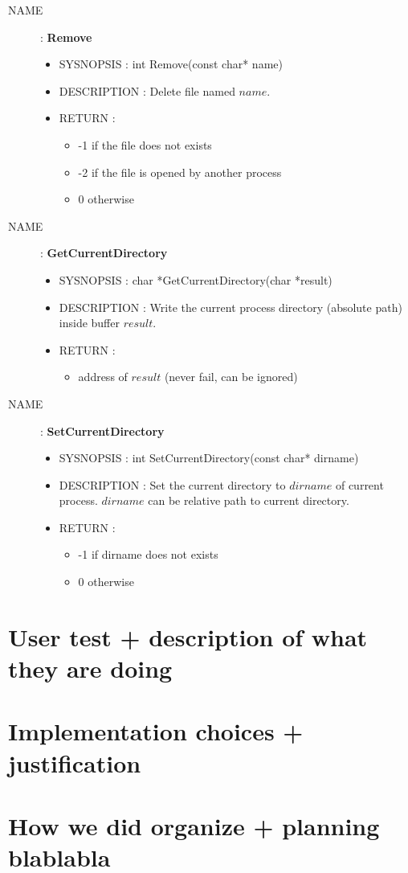 \documentclass[a4paper,10pt]{article}
\begin{document}
\begin{description}
    \item [NAME] : \textbf{Remove}
        \begin{itemize}
            \item SYSNOPSIS : int Remove(const char* name)
            \item DESCRIPTION :
                Delete file named $name$.
            \item RETURN :
                \begin{itemize}
                    \item -1 if the file does not exists
                    \item -2 if the file is opened by another process
                    \item 0 otherwise
                \end{itemize}
        \end{itemize}

    \item [NAME] : \textbf{GetCurrentDirectory}
        \begin{itemize}
            \item SYSNOPSIS : char *GetCurrentDirectory(char *result)
            \item DESCRIPTION :
                Write the current process directory (absolute path) inside buffer $result$.
            \item RETURN :
                \begin{itemize}
                    \item address of $result$ (never fail, can be ignored)
                \end{itemize}
        \end{itemize}

    \item [NAME] : \textbf{SetCurrentDirectory}
        \begin{itemize}
            \item SYSNOPSIS : int SetCurrentDirectory(const char* dirname)
            \item DESCRIPTION :
                Set the current directory to $dirname$ of current process.
                $dirname$ can be relative path to current directory.
            \item RETURN :
                \begin{itemize}
                    \item -1 if dirname does not exists
                    \item 0 otherwise
                \end{itemize}
        \end{itemize}
    \end{description}

\section{User test + description of what they are doing}
\section{Implementation choices + justification}
\section{How we did organize + planning blablabla}
\end{document}
